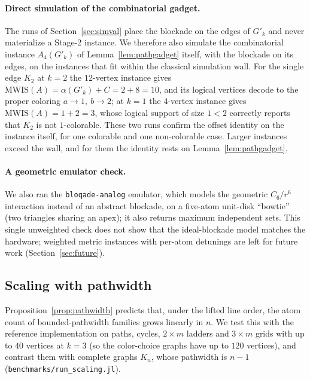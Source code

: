 \documentclass[a4paper,fleqn]{cas-sc}
\newcommand{\MWIS}{\mathrm{MWIS}}
\newcommand{\indep}{\alpha}
\begin{document}
\paragraph{Direct simulation of the combinatorial gadget.}
\label{sec:gadgetval}
The runs of Section~\ref{sec:simval} place the blockade on the edges of $G'_k$ and
never materialize a Stage-2 instance. We therefore also simulate the combinatorial
instance $A_4(G'_k)$ of Lemma~\ref{lem:pathgadget} itself, with the blockade on its
edges, on
the instances that fit within the classical simulation wall. For the single edge $K_2$ at $k=2$ the
$12$-vertex instance gives $\MWIS(A)=\indep(G'_k)+C=2+8=10$, and its logical vertices
decode to the proper coloring $a\!\to\!1,\ b\!\to\!2$; at $k=1$ the $4$-vertex
instance gives
$\MWIS(A)=1+2=3$, whose logical support of size $1<2$ correctly reports that $K_2$ is
not $1$-colorable. These two runs confirm the offset identity on the instance itself,
for one colorable and one non-colorable case. Larger instances exceed the wall, and
for them the identity rests on Lemma~\ref{lem:pathgadget}.

\paragraph{A geometric emulator check.}
\label{sec:bloqade}
We also ran the \texttt{bloqade-analog} emulator, which models the geometric
$C_6/r^6$ interaction instead of an abstract blockade, on a five-atom unit-disk
``bowtie'' (two triangles sharing an apex); it also returns maximum independent sets.
This single unweighted check does not show that the ideal-blockade model matches the
hardware; weighted metric instances with per-atom detunings are left for future work
(Section~\ref{sec:future}).

\subsection{Scaling with pathwidth}
\label{sec:scaling}

Proposition~\ref{prop:pathwidth} predicts that, under the lifted line order, the atom
count of bounded-pathwidth families grows linearly in $n$. We test this with the
reference implementation on paths, cycles, $2\times m$ ladders and $3\times m$ grids
with up to $40$ vertices at $k=3$ (so the color-choice graphs have up to $120$
vertices), and contrast them with complete graphs $K_n$, whose pathwidth is $n-1$
(\texttt{benchmarks/run\_scaling.jl}).
\end{document}
